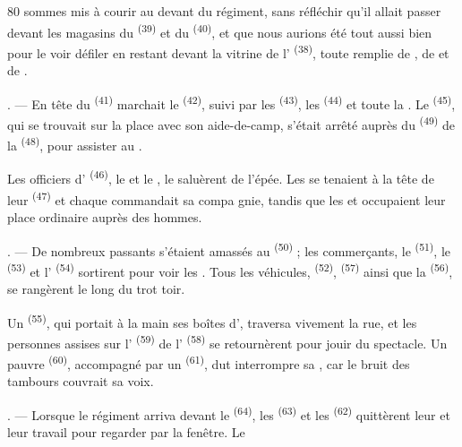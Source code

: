 \begin{VUpage}[82]{80}
\VUcontinue
sommes mis à courir au devant du régiment, sans\nl
réfléchir qu'il allait passer devant les magasins du\nl
{} \textsuperscript{(39)} et du  \textsuperscript{(40)}, et que nous aurions\nl
été tout aussi bien pour le voir défiler en restant\nl
devant la vitrine de l' \textsuperscript{(38)}, toute remplie de\nl
{}, de  et de .

. --- En tête du  \textsuperscript{(41)} marchait le \cc
{} \textsuperscript{(42)}, suivi par les  \textsuperscript{(43)}, les\nl
{} \textsuperscript{(44)} et toute la . Le  \textsuperscript{(45)},\nl
qui se trouvait sur la place avec son aide-de-camp,\nl
s'était arrêté auprès du  \textsuperscript{(49)} de la \cc
{} \textsuperscript{(48)}, pour assister au .

\VUblancAlinea
Les officiers d' \textsuperscript{(46)}, le  et le\nl
{}, le saluèrent de l'épée. Les\nl
{} se tenaient à la tête de leur \cc
{} \textsuperscript{(47)} et chaque  commandait sa compa\cc
gnie, tandis que les \nl
et  occupaient leur place ordinaire\nl
auprès des hommes.

. --- De nombreux passants s'étaient amassés au\nl
{} \textsuperscript{(50)} ; les commerçants, le \nl
{} \textsuperscript{(51)}, le  \textsuperscript{(53)} et l' \textsuperscript{(54)}\nl
sortirent pour voir les . Tous les véhicules,\nl
{} \textsuperscript{(52)},  \textsuperscript{(57)} ainsi que la\nl
{} \textsuperscript{(56)}, se rangèrent le long du trot\cc
toir.

Un  \textsuperscript{(55)}, qui portait à la\nl
main ses boîtes d', traversa vivement\nl
la rue, et les personnes assises sur l' \textsuperscript{(59)}\nl
de l' \textsuperscript{(58)} se retournèrent pour jouir du\nl
spectacle. Un pauvre  \textsuperscript{(60)},\nl
accompagné par un  \textsuperscript{(61)}, dut\nl
interrompre sa , car le bruit des tambours\nl
couvrait sa voix.

. --- Lorsque le régiment arriva devant le\nl
{} \textsuperscript{(64)}, les  \textsuperscript{(63)}\nl
et les  \textsuperscript{(62)} quittèrent leur \cc
{} et leur travail pour regarder par la fenêtre. Le
\parplein
\end{VUpage}

